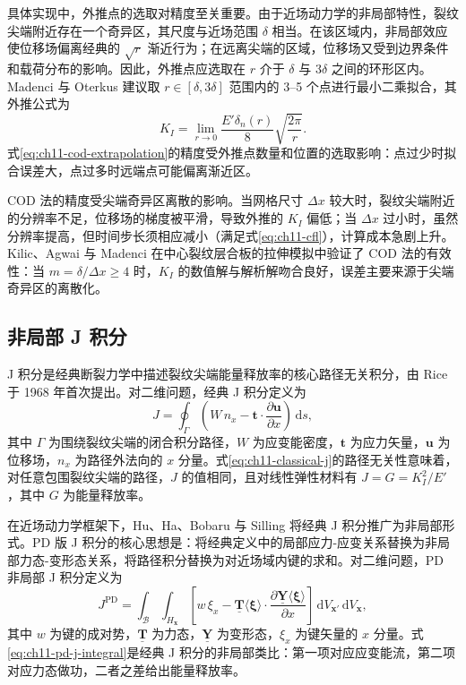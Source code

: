 具体实现中，外推点的选取对精度至关重要。由于近场动力学的非局部特性，裂纹尖端附近存在一个奇异区，其尺度与近场范围 $\delta$ 相当。在该区域内，非局部效应使位移场偏离经典的 $\sqrt{r}$ 渐近行为；在远离尖端的区域，位移场又受到边界条件和载荷分布的影响。因此，外推点应选取在 $r$ 介于 $\delta$ 与 $3\delta$ 之间的环形区内。Madenci 与 Oterkus \cite{MadenciOterkus2014} 建议取 $r\in[\delta, 3\delta]$ 范围内的 3--5 个点进行最小二乘拟合，其外推公式为
\begin{equation}
K_I=\lim_{r\to 0}\frac{E'\delta_n(r)}{8}\sqrt{\frac{2\pi}{r}}.
\label{eq:ch11-cod-extrapolation}
\end{equation}
式\eqref{eq:ch11-cod-extrapolation}的精度受外推点数量和位置的选取影响：点过少时拟合误差大，点过多时远端点可能偏离渐近区。

COD 法的精度受尖端奇异区离散的影响。当网格尺寸 $\Delta x$ 较大时，裂纹尖端附近的分辨率不足，位移场的梯度被平滑，导致外推的 $K_I$ 偏低；当 $\Delta x$ 过小时，虽然分辨率提高，但时间步长须相应减小（满足式\eqref{eq:ch11-cfl}），计算成本急剧上升。Kilic、Agwai 与 Madenci \cite{KilicAgwaiMadenci2009} 在中心裂纹层合板的拉伸模拟中验证了 COD 法的有效性：当 $m=\delta/\Delta x\geq 4$ 时，$K_I$ 的数值解与解析解吻合良好，误差主要来源于尖端奇异区的离散化。

\subsection{非局部 J 积分}\label{sec:ch11-nonlocal-j}

J 积分是经典断裂力学中描述裂纹尖端能量释放率的核心路径无关积分，由 Rice 于 1968 年首次提出。对二维问题，经典 J 积分定义为
\begin{equation}
J=\oint_{\Gamma}\left(W\,n_x-\mathbf{t}\cdot\frac{\partial\mathbf{u}}{\partial x}\right)\,\mathrm{d}s,
\label{eq:ch11-classical-j}
\end{equation}
其中 $\Gamma$ 为围绕裂纹尖端的闭合积分路径，$W$ 为应变能密度，$\mathbf{t}$ 为应力矢量，$\mathbf{u}$ 为位移场，$n_x$ 为路径外法向的 $x$ 分量。式\eqref{eq:ch11-classical-j}的路径无关性意味着，对任意包围裂纹尖端的路径，$J$ 的值相同，且对线性弹性材料有 $J=G=K_I^2/E'$，其中 $G$ 为能量释放率。

在近场动力学框架下，Hu、Ha、Bobaru 与 Silling \cite{HuHaBobaruSilling2012} 将经典 J 积分推广为非局部形式。PD 版 J 积分的核心思想是：将经典定义中的局部应力-应变关系替换为非局部力态-变形态关系，将路径积分替换为对近场域内键的求和。对二维问题，PD 非局部 J 积分定义为
\begin{equation}
J^{\mathrm{PD}}=\int_{\mathcal{B}}\int_{H_{\mathbf{x}}}\left[w\,\xi_x-\underline{\mathbf{T}}\langle\boldsymbol{\xi}\rangle\cdot\frac{\partial\underline{\mathbf{Y}}\langle\boldsymbol{\xi}\rangle}{\partial x}\right]\,\mathrm{d}V_{\mathbf{x}'}\,\mathrm{d}V_{\mathbf{x}},
\label{eq:ch11-pd-j-integral}
\end{equation}
其中 $w$ 为键的成对势，$\underline{\mathbf{T}}$ 为力态，$\underline{\mathbf{Y}}$ 为变形态，$\xi_x$ 为键矢量的 $x$ 分量。式\eqref{eq:ch11-pd-j-integral}是经典 J 积分的非局部类比：第一项对应应变能流，第二项对应力态做功，二者之差给出能量释放率。


